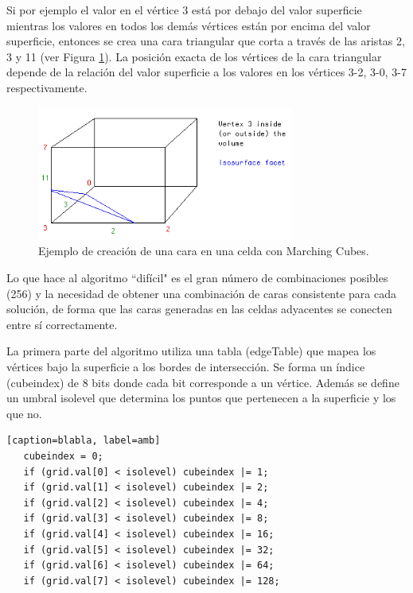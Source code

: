\documentclass[12pt]{article}
\begin{document}
Si por ejemplo el valor en el vértice 3 está por debajo del valor superficie mientras los valores en todos los demás vértices están por encima del valor superficie, entonces se crea una cara triangular que corta a través de las aristas 2, 3 y 11 (ver Figura \ref{mc2}). La posición exacta de los vértices de la cara triangular depende de la relación del valor superficie a los valores en los vértices 3-2, 3-0, 3-7 respectivamente.
\begin{figure}[h!]
\includegraphics[width=0.75\textwidth,center]{marchingcubes2.png}
\caption{Ejemplo de creación de una cara en una celda con Marching Cubes.}
\label{mc2}
\end{figure}
Lo que hace al algoritmo ``difícil" es el gran número de combinaciones posibles (256) y la necesidad de obtener una combinación de caras consistente para cada solución, de forma que las caras generadas en las celdas adyacentes se conecten entre sí correctamente.

La primera parte del algoritmo utiliza una tabla (edgeTable) que mapea los vértices bajo la superficie a los bordes de intersección. Se forma un índice (cubeindex) de 8 bits donde cada bit corresponde a un vértice. Además se define un umbral isolevel que determina los puntos que pertenecen a la superficie y los que no.
\lstset{language=C}          %

\begin{lstlisting}[frame=single][caption=blabla, label=amb]
   cubeindex = 0;
   if (grid.val[0] < isolevel) cubeindex |= 1;
   if (grid.val[1] < isolevel) cubeindex |= 2;
   if (grid.val[2] < isolevel) cubeindex |= 4;
   if (grid.val[3] < isolevel) cubeindex |= 8;
   if (grid.val[4] < isolevel) cubeindex |= 16;
   if (grid.val[5] < isolevel) cubeindex |= 32;
   if (grid.val[6] < isolevel) cubeindex |= 64;
   if (grid.val[7] < isolevel) cubeindex |= 128;
\end{lstlisting}
\end{document}
